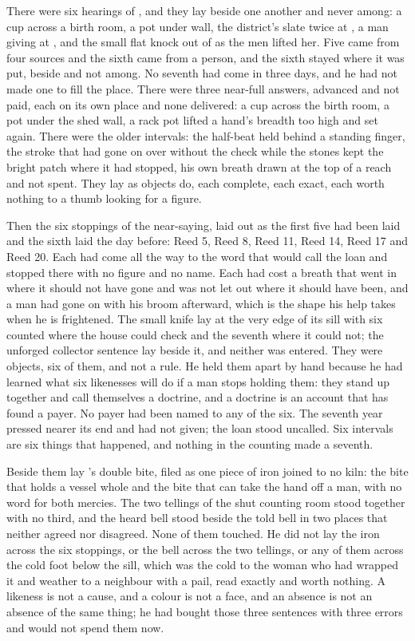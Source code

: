 There were six hearings of , and they lay beside one another and never among: a cup across a birth room, a pot under  wall, the district's slate twice at , a man giving at , and the small flat knock out of  as the men lifted her. Five came from four sources and the sixth came from a person, and the sixth stayed where it was put, beside and not among. No seventh had come in three days, and he had not made one to fill the place. There were three near-full answers, advanced and not paid, each on its own place and none delivered: a cup across the birth room, a pot under the shed wall, a rack pot lifted a hand's breadth too high and set again. There were the older intervals: the half-beat held behind a standing finger, the stroke that had gone on over  without the check while the stones kept the bright patch where it had stopped, his own breath drawn at the top of a reach and not spent. They lay as objects do, each complete, each exact, each worth nothing to a thumb looking for a figure.

Then the six stoppings of the near-saying, laid out as the first five had been laid and the sixth laid the day before: Reed 5, Reed 8, Reed 11, Reed 14, Reed 17 and Reed 20. Each had come all the way to the word that would call the loan and stopped there with no figure and no name. Each had cost a breath that went in where it should not have gone and was not let out where it should have been, and a man had gone on with his broom afterward, which is the shape his help takes when he is frightened. The small knife lay at the very edge of its sill with six counted where the house could check and the seventh where it could not; the unforged collector sentence lay beside it, and neither was entered. They were objects, six of them, and not a rule. He held them apart by hand because he had learned what six likenesses will do if a man stops holding them: they stand up together and call themselves a doctrine, and a doctrine is an account that has found a payer. No payer had been named to any of the six. The seventh year pressed nearer its end and had not given; the loan stood uncalled. Six intervals are six things that happened, and nothing in the counting made a seventh.

Beside them lay 's double bite, filed as one piece of iron joined to no kiln: the bite that holds a vessel whole and the bite that can take the hand off a man, with no  word for both mercies. The two tellings of the shut counting room stood together with no third, and the heard bell stood beside the told bell in two places that neither agreed nor disagreed. None of them touched. He did not lay the iron across the six stoppings, or the bell across the two tellings, or any of them across the cold foot below the sill, which was the cold to the woman who had wrapped it and weather to a neighbour with a pail, read exactly and worth nothing. A likeness is not a cause, and a colour is not a face, and an absence is not an absence of the same thing; he had bought those three sentences with three errors and would not spend them now.

